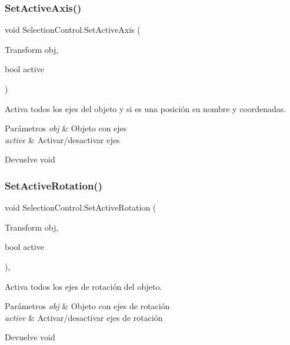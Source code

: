 \subsubsection{\texorpdfstring{SetActiveAxis()}{SetActiveAxis()}}
{\footnotesize\ttfamily void Selection\+Control.\+Set\+Active\+Axis (\begin{DoxyParamCaption}\item[{Transform}]{obj,  }\item[{bool}]{active }\end{DoxyParamCaption})\hspace{0.3cm}{\ttfamily [inline]}}

Activa todos los ejes del objeto y si es una posición su nombre y coordenadas. 
\begin{DoxyParams}{Parámetros}
{\em obj} & Objeto con ejes \\
\hline
{\em active} & Activar/desactivar ejes \\
\hline
\end{DoxyParams}
\begin{DoxyReturn}{Devuelve}
void 
\end{DoxyReturn}
\mbox{\label{class_selection_control_a124591d0f0eac9b99cd9a7cc4f9839c7}} 
\subsubsection{\texorpdfstring{SetActiveRotation()}{SetActiveRotation()}}
{\footnotesize\ttfamily void Selection\+Control.\+Set\+Active\+Rotation (\begin{DoxyParamCaption}\item[{Transform}]{obj,  }\item[{bool}]{active }\end{DoxyParamCaption})\hspace{0.3cm}{\ttfamily [inline]}, {\ttfamily [private]}}

Activa todos los ejes de rotación del objeto. 
\begin{DoxyParams}{Parámetros}
{\em obj} & Objeto con ejes de rotación \\
\hline
{\em active} & Activar/desactivar ejes de rotación \\
\hline
\end{DoxyParams}
\begin{DoxyReturn}{Devuelve}
void 
\end{DoxyReturn}
\mbox{\label{class_selection_control_a5d456be16e3132ae65d37f866ee009f3}} 
